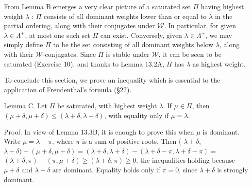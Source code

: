 \documentclass[10pt]{article}
\begin{document}
From Lemma B emerges a very clear picture of a saturated set $\Pi$ having highest weight $\lambda$ : $\Pi$ consists of all dominant weights lower than or equal to $\lambda$ in the partial ordering, along with their conjugates under $\mathscr{W}$. In particular, for given $\lambda \in \Lambda^{+}$, at most one such set $\Pi$ can exist. Conversely, given $\lambda \in \Lambda^{+}$, we may simply define $\Pi$ to be the set consisting of all dominant weights below $\lambda$, along with their $\mathscr{W}$-conjugates. Since $\Pi$ is stable under $\mathscr{W}$, it can be seen to be saturated (Exercise 10), and thanks to Lemma 13.2A, $\Pi$ has $\lambda$ as highest weight.

To conclude this section, we prove an inequality which is essential to the application of Freudenthal's formula (§22).

Lemma C. Let $\Pi$ be saturated, with highest weight $\lambda$. If $\mu \in \Pi$, then $(\mu+\delta, \mu+\delta) \leq(\lambda+\delta, \lambda+\delta)$, with equality only if $\mu=\lambda$.

Proof. In view of Lemma 13.3B, it is enough to prove this when $\mu$ is dominant. Write $\mu=\lambda-\pi$, where $\pi$ is a sum of positive roots. Then ( $\lambda+\delta$, $\lambda+\delta)-(\mu+\delta, \mu+\delta)=(\lambda+\delta, \lambda+\delta)-(\lambda+\delta-\pi, \lambda+\delta-\pi)=$ $(\lambda+\delta, \pi)+(\pi, \mu+\delta) \geq(\lambda+\delta, \pi) \geq 0$, the inequalities holding because $\mu+\delta$ and $\lambda+\delta$ are dominant. Equality holds only if $\pi=0$, since $\lambda+\delta$ is strongly dominant.
\end{document}
